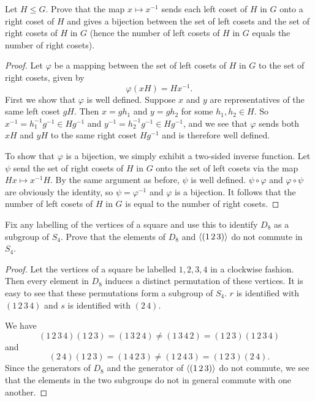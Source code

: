  Let $H\leq G$. Prove that the map $x\mapsto x^{-1}$
sends each left coset of $H$ in $G$ onto a right coset of $H$ and
gives a bijection between the set of left cosets and the set of right
cosets of $H$ in $G$ (hence the number of left cosets of $H$ in $G$
equals the number of right cosets).
\begin{proof}
  Let $\varphi$ be a mapping between the set of left cosets of $H$ in
  $G$ to the set of right cosets, given by
  \begin{equation*}
    \varphi(xH) = Hx^{-1}.
  \end{equation*}
  First we show that $\varphi$ is well defined. Suppose $x$ and $y$
  are representatives of the same left coset $gH$. Then $x = gh_1$ and
  $y = gh_2$ for some $h_1,h_2\in H$. So
  $x^{-1} = h_1^{-1}g^{-1}\in Hg^{-1}$ and
  $y^{-1} = h_2^{-1}g^{-1}\in Hg^{-1}$, and we see that $\varphi$
  sends both $xH$ and $yH$ to the same right coset $Hg^{-1}$ and is
  therefore well defined.

  To show that $\varphi$ is a bijection, we simply exhibit a two-sided
  inverse function. Let $\psi$ send the set of right cosets of $H$ in
  $G$ onto the set of left cosets via the map $Hx \mapsto x^{-1}H$. By
  the same argument as before, $\psi$ is well
  defined. $\psi\circ\varphi$ and $\varphi\circ\psi$ are obviously the
  identity, so $\psi = \varphi^{-1}$ and $\varphi$ is a bijection. It
  follows that the number of left cosets of $H$ in $G$ is equal to the
  number of right cosets.
\end{proof}

 Fix any labelling of the vertices of a square and use
this to identify $D_8$ as a subgroup of $S_4$. Prove that the elements
of $D_8$ and $\langle{(1\,2\,3)}\rangle$ do not commute in $S_4$.
\begin{proof}
  Let the vertices of a square be labelled $1,2,3,4$ in a clockwise
  fashion. Then every element in $D_8$ induces a distinct permutation
  of these vertices. It is easy to see that these permutations form a
  subgroup of $S_4$. $r$ is identified with $(1\,2\,3\,4)$ and $s$ is
  identified with $(2\,4)$.

  We have
  \begin{equation*}
    (1\,2\,3\,4)(1\,2\,3)
    = (1\,3\,2\,4)
    \neq (1\,3\,4\,2)
    = (1\,2\,3)(1\,2\,3\,4)
  \end{equation*}
  and
  \begin{equation*}
    (2\,4)(1\,2\,3)
    = (1\,4\,2\,3)
    \neq (1\,2\,4\,3)
    = (1\,2\,3)(2\,4).
  \end{equation*}
  Since the generators of $D_8$ and the generator of $\langle{(1\,2\,3)}\rangle$
  do not commute, we see that the elements in the two subgroups do not
  in general commute with one another.
\end{proof}

